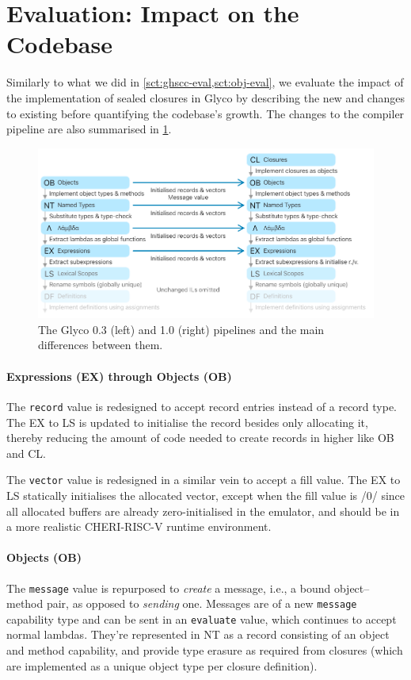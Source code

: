 \documentclass[main.tex]{subfiles}
\begin{document}
\section{Evaluation: Impact on the Codebase} \label{sct:cls-eval}
Similarly to what we did in \cref{sct:ghscc-eval,sct:obj-eval}, we evaluate the impact of the implementation of sealed closures in Glyco by describing the new  and changes to existing  before quantifying the codebase's growth. The changes to the compiler pipeline are also summarised in \cref{fig:pipeline10}.

\begin{figure}
	\centering
	\includegraphics{Images/Pipeline v1.0.pdf}
	\caption{The Glyco 0.3 (left) and 1.0 (right) pipelines and the main differences between them.}
	\label{fig:pipeline10}
\end{figure}

\paragraph{Expressions (EX) through Objects (OB)} The \texttt{record} value is redesigned to accept record entries instead of a record type. The EX to LS  is updated to initialise the record besides only allocating it, thereby reducing the amount of code needed to create records in higher  like OB and CL.

The \texttt{vector} value is redesigned in a similar vein to accept a fill value. The EX to LS  statically initialises the allocated vector, except when the fill value is \iil/0/ since all allocated buffers are already zero-initialised in the emulator, and should be in a more realistic CHERI-RISC-V runtime environment.

\paragraph{Objects (OB)} The \texttt{message} value is repurposed to \emph{create} a message, i.e., a bound object–method pair, as opposed to \emph{sending} one. Messages are of a new \texttt{message} capability type and can be sent in an \texttt{evaluate} value, which continues to accept normal lambdas. They're represented in NT as a record consisting of an object and method capability, and provide type erasure as required from closures (which are implemented as a unique object type per closure definition).
\end{document}
